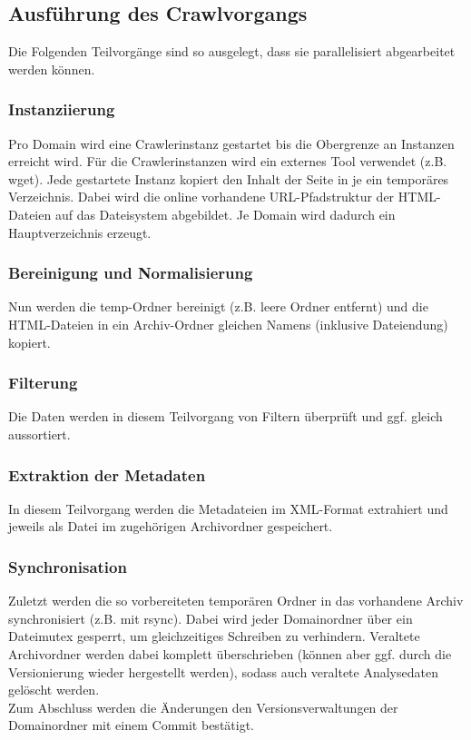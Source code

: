 \subsection{Ausführung des Crawlvorgangs}
	Die Folgenden Teilvorgänge sind so ausgelegt, dass sie parallelisiert abgearbeitet werden können.
	\subsubsection{Instanziierung} \label{spec:req:crawler:instance}
		Pro Domain wird eine Crawlerinstanz gestartet bis die Obergrenze an Instanzen erreicht wird.
		Für die Crawlerinstanzen wird ein externes Tool verwendet (z.B. wget).
		Jede gestartete Instanz kopiert den Inhalt der Seite in je ein temporäres Verzeichnis.
		Dabei wird die online vorhandene URL-Pfadstruktur der HTML-Dateien auf das Dateisystem abgebildet.
		Je Domain wird dadurch ein Hauptverzeichnis erzeugt.
	\subsubsection{Bereinigung und Normalisierung} \label{spec:req:crawler:normalize}
		Nun werden die temp-Ordner bereinigt (z.B. leere Ordner entfernt)
		und die HTML-Dateien in ein Archiv-Ordner gleichen Namens (inklusive Dateiendung) kopiert.
	\subsubsection{Filterung} \label{spec:req:crawler:filter}
		Die Daten werden in diesem Teilvorgang von Filtern überprüft und ggf. gleich aussortiert.
	\subsubsection{Extraktion der Metadaten}\label{spec:req:crawler:extraction}
		In diesem Teilvorgang werden die Metadateien im XML-Format extrahiert und jeweils als Datei im zugehörigen Archivordner gespeichert.
	\subsubsection{Synchronisation}\label{spec:req:crawler:sync}
		Zuletzt werden die so vorbereiteten temporären Ordner in das vorhandene Archiv synchronisiert (z.B. mit rsync). 
		Dabei wird jeder Domainordner über ein Dateimutex gesperrt, um gleichzeitiges Schreiben zu verhindern. 
		Veraltete Archivordner werden dabei komplett überschrieben (können aber ggf. durch die Versionierung wieder hergestellt werden),
		sodass auch veraltete Analysedaten gelöscht werden.\\
		Zum Abschluss werden die Änderungen den Versionsverwaltungen der Domainordner mit einem Commit bestätigt.
